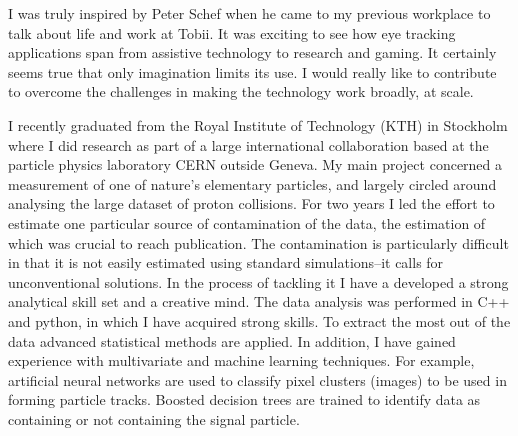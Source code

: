 \documentclass[11pt, a4paper]{../awesome-cv} %
\begin{document}
\sloppy %

\makecvheader %

\makelettertitle %


\begin{cvletter}
\vspace{.2cm}
I was truly inspired by Peter Schef when he came to my previous workplace to talk about life and work at Tobii. 
It was exciting to see how eye tracking applications span from assistive technology to research and gaming.
It certainly seems true that only imagination limits its use.
I would really like to contribute to overcome the challenges in making the technology work broadly, at scale.


I recently graduated from the Royal Institute of Technology (KTH) in Stockholm where I did research as part of a large international collaboration based at the particle physics laboratory CERN outside Geneva.
My main project concerned a measurement of one of nature's elementary particles, and largely circled around analysing the large dataset of proton collisions. %
For two years I led the effort to estimate one particular source of contamination of the data, the estimation of which was crucial to reach publication. 
The contamination is particularly difficult in that it is not easily estimated using standard simulations–it calls for unconventional solutions.
In the process of tackling it I have a developed a strong analytical skill set and a creative mind. %
The data analysis was performed in C++ and python, in which I have acquired strong skills. %
To extract the most out of the data advanced statistical methods are applied.
In addition, I have gained experience with multivariate and machine learning techniques. %
For example, artificial neural networks are used to classify pixel clusters (images) to be used in forming particle tracks. 
Boosted decision trees are trained to identify data as containing or not containing the signal particle.  %



\end{cvletter}
\end{document}
